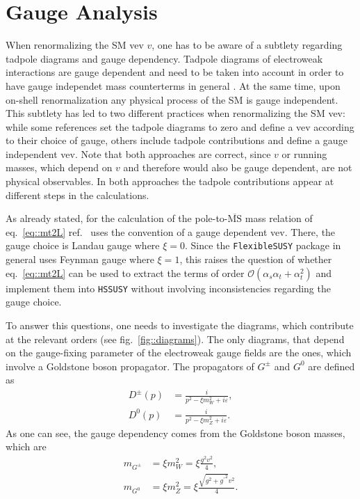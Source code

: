 \documentclass[a4paper,12pt]{book}
\begin{document}
\section{Gauge Analysis}
\label{sec::gauge}
When renormalizing the SM vev $v$, one has to be aware of a subtlety regarding tadpole diagrams and gauge dependency. Tadpole diagrams of electroweak interactions are gauge dependent and need to be taken into account in order to have gauge independet mass counterterms in general  \cite{tadpole}. At the same time, upon on-shell renormalization any physical process of the SM is gauge independent. This subtlety has led to two different practices when renormalizing the SM vev: while some references set the tadpole diagrams to zero and define a vev according to their choice of gauge, others include tadpole contributions and define a gauge independent vev. Note that both approaches are correct, since $v$ or running masses, which depend on $v$ and therefore would also be gauge dependent, are not physical observables. In both approaches the tadpole contributions appear at different steps in the calculations.\par
As already stated, for the calculation of the pole-to-$\overline{\text{MS}}$ mass relation of eq.\ \eqref{eq::mt2L} ref.\ \cite{martinmain} uses the convention of a gauge dependent vev. There, the gauge choice is Landau gauge where $\xi=0$. Since the \texttt{FlexibleSUSY} package in general uses Feynman gauge where $\xi=1$, this raises the question of whether eq.\ \eqref{eq::mt2L} can be used to extract the terms of order $\mathcal{O}(\alpha_s\alpha_t + \alpha_t^2)$ and implement them into \texttt{HSSUSY} without involving inconsistencies regarding the gauge choice.\par 
To answer this questions, one needs to investigate the diagrams, which contribute at the relevant orders (see fig.\ \ref{fig::diagrams}). The only diagrams, that depend on the gauge-fixing parameter of the electroweak gauge fields are the ones, which involve a Goldstone boson propagator. The propagators of $G^\pm$ and $G^0$ are defined as 
\begin{align}
D^\pm(p)&= \frac{i}{p^2-\xi m_W^2+i\varepsilon},\\
D^0(p)&= \frac{i}{p^2-\xi m_Z^2+i\varepsilon}.
\end{align}
As one can see, the gauge dependency comes from the Goldstone boson masses, which are 
\begin{align}
m_{G^\pm} &= \xi m_W^2 = \xi \frac{g^2 v^2}{4},\\
m_{G^0} &= \xi m_Z^2 = \xi \frac{\sqrt{g^2+{g^\prime}^2}v^2}{4}.
\end{align}
\end{document}
